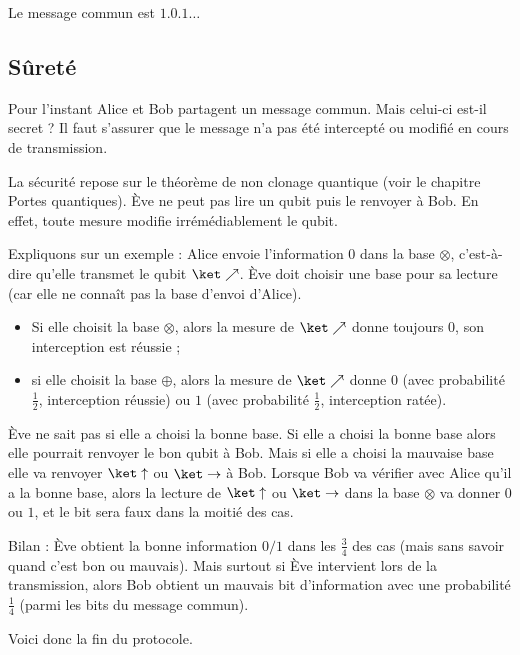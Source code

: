 \documentclass[11pt,class=report,crop=false]{standalone}
\begin{document}
Le message commun est $1.0.1\ldots$


\subsection{Sûreté}


Pour l'instant Alice et Bob partagent un message commun. Mais celui-ci est-il secret ? Il faut s'assurer que le message n'a pas été intercepté ou modifié en cours de transmission.



La sécurité repose sur le théorème de non clonage quantique (voir le chapitre \og{}Portes quantiques\fg{}). Ève ne peut pas lire un qubit puis le renvoyer à Bob. En effet, toute mesure modifie irrémédiablement le qubit.


\medskip

Expliquons sur un exemple : Alice envoie l'information $0$ dans la base $\otimes$, c'est-à-dire qu'elle transmet le qubit $\ket\nearrow$. Ève doit choisir une base pour sa lecture (car elle ne connaît pas la base d'envoi d'Alice).
\begin{itemize}
  \item Si elle choisit la base $\otimes$, alors la mesure de $\ket\nearrow$ donne toujours $0$, son interception est réussie ;
  \item si elle choisit la base $\oplus$, alors la mesure de $\ket\nearrow$ donne $0$ (avec probabilité $\frac12$, interception réussie) ou $1$ (avec probabilité $\frac12$, interception ratée).
\end{itemize}
Ève ne sait pas si elle a choisi la bonne base.
Si elle a choisi la bonne base alors elle pourrait renvoyer le bon qubit à Bob. Mais si elle a choisi la mauvaise base elle va renvoyer $\ket\uparrow$ ou $\ket\rightarrow$ à Bob.
Lorsque Bob va vérifier avec Alice qu'il a la bonne base, alors la lecture de $\ket\uparrow$ ou $\ket\rightarrow$ dans la base $\otimes$ va donner $0$ ou $1$, et le bit sera faux dans la moitié des cas.

Bilan : Ève obtient la bonne information $0/1$ dans les $\frac34$ des cas (mais sans savoir quand c'est bon ou mauvais). Mais surtout si Ève intervient lors de la transmission, alors Bob obtient un mauvais bit d'information avec une probabilité $\frac14$ (parmi les bits du message commun).


\medskip

Voici donc la fin du protocole.
\end{document}
